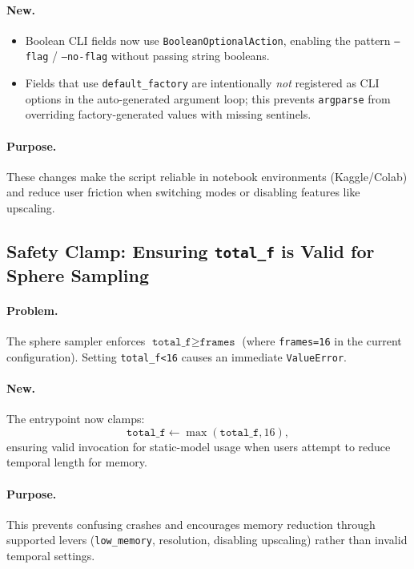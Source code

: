 \documentclass[11pt,a4paper]{article}
\begin{document}
\paragraph{New.}
\begin{itemize}[nosep]
    \item Boolean CLI fields now use \texttt{BooleanOptionalAction}, enabling the pattern \texttt{--flag} / \texttt{--no-flag} without passing string booleans.
    \item Fields that use \texttt{default\_factory} are intentionally \emph{not} registered as CLI options in the auto-generated argument loop; this prevents \texttt{argparse} from overriding factory-generated values with missing sentinels.
\end{itemize}

\paragraph{Purpose.}
These changes make the script reliable in notebook environments (Kaggle/Colab) and reduce user friction when switching modes or disabling features like upscaling.

\subsection{Safety Clamp: Ensuring \texttt{total\_f} is Valid for Sphere Sampling}

\paragraph{Problem.}
The sphere sampler enforces \(\texttt{total\_f} \ge \texttt{frames}\) (where \texttt{frames=16} in the current configuration).
Setting \texttt{total\_f<16} causes an immediate \texttt{ValueError}.

\paragraph{New.}
The entrypoint now clamps:
\[
    \texttt{total\_f} \leftarrow \max(\texttt{total\_f}, 16),
\]
ensuring valid invocation for static-model usage when users attempt to reduce temporal length for memory.

\paragraph{Purpose.}
This prevents confusing crashes and encourages memory reduction through supported levers (\texttt{low\_memory}, resolution, disabling upscaling) rather than invalid temporal settings.
\end{document}
